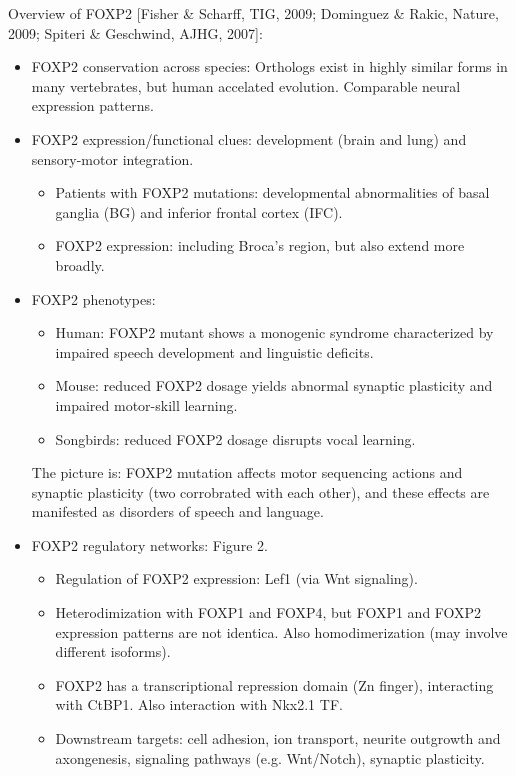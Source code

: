 \documentclass{report}
\begin{document}
Overview of FOXP2 [Fisher \& Scharff, TIG, 2009; Dominguez \& Rakic, Nature, 2009; Spiteri \& Geschwind, AJHG, 2007]: 
\begin{itemize}
	\item FOXP2 conservation across species: Orthologs exist in highly similar forms in many vertebrates, but human accelated evolution. Comparable neural expression patterns. 
	
	\item FOXP2 expression/functional clues: development (brain and lung) and sensory-motor integration. 
	\begin{itemize}
		\item Patients with FOXP2 mutations: developmental abnormalities of basal ganglia (BG) and inferior frontal cortex (IFC).
		\item FOXP2 expression: including Broca's region, but also extend more broadly. 
	\end{itemize}
	
	\item FOXP2 phenotypes: 
	\begin{itemize}
		\item Human: FOXP2 mutant shows a monogenic syndrome characterized by impaired speech development and linguistic deficits. 
		\item Mouse: reduced FOXP2 dosage yields abnormal synaptic plasticity and impaired motor-skill learning. 
		\item Songbirds: reduced FOXP2 dosage disrupts vocal learning. 
	\end{itemize}
	The picture is: FOXP2 mutation affects motor sequencing actions and synaptic plasticity (two corrobrated with each other), and these effects are manifested as disorders of speech and language. 
	
	\item FOXP2 regulatory networks: Figure 2. 
	\begin{itemize}
		\item Regulation of FOXP2 expression: Lef1 (via Wnt signaling). 
		\item Heterodimization with FOXP1 and FOXP4, but FOXP1 and FOXP2 expression patterns are not identica. Also homodimerization (may involve different isoforms). 
		\item FOXP2 has a transcriptional repression domain (Zn finger), interacting with CtBP1. Also interaction with Nkx2.1 TF. 
		\item Downstream targets: cell adhesion, ion transport, neurite outgrowth and axongenesis, signaling pathways (e.g. Wnt/Notch), synaptic plasticity. 
	\end{itemize}
\end{itemize}
\end{document}
